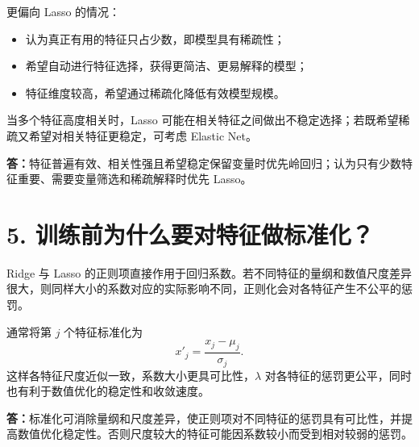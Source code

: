 \documentclass[UTF8,a4paper,11pt]{ctexart}
\begin{document}
更偏向 Lasso 的情况：
\begin{itemize}[leftmargin=2em]
\item 认为真正有用的特征只占少数，即模型具有稀疏性；
\item 希望自动进行特征选择，获得更简洁、更易解释的模型；
\item 特征维度较高，希望通过稀疏化降低有效模型规模。
\end{itemize}

当多个特征高度相关时，Lasso 可能在相关特征之间做出不稳定选择；若既希望稀疏又希望对相关特征更稳定，可考虑 Elastic Net。

\textbf{答：}特征普遍有效、相关性强且希望稳定保留变量时优先岭回归；认为只有少数特征重要、需要变量筛选和稀疏解释时优先 Lasso。

\section*{5. 训练前为什么要对特征做标准化？}
Ridge 与 Lasso 的正则项直接作用于回归系数。若不同特征的量纲和数值尺度差异很大，则同样大小的系数对应的实际影响不同，正则化会对各特征产生不公平的惩罚。

通常将第 $j$ 个特征标准化为
\[
x'_j=\frac{x_j-\mu_j}{\sigma_j}.
\]
这样各特征尺度近似一致，系数大小更具可比性，$\lambda$ 对各特征的惩罚更公平，同时也有利于数值优化的稳定性和收敛速度。

\textbf{答：}标准化可消除量纲和尺度差异，使正则项对不同特征的惩罚具有可比性，并提高数值优化稳定性。否则尺度较大的特征可能因系数较小而受到相对较弱的惩罚。
\end{document}
